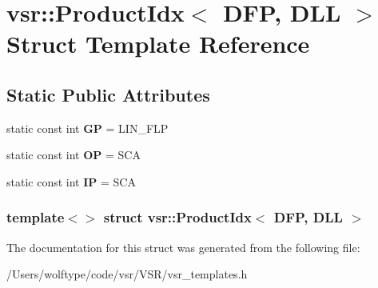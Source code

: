 \hypertarget{structvsr_1_1_product_idx_3_01_d_f_p_00_01_d_l_l_01_4}{\section{vsr\-:\-:Product\-Idx$<$ D\-F\-P, D\-L\-L $>$ Struct Template Reference}
\label{structvsr_1_1_product_idx_3_01_d_f_p_00_01_d_l_l_01_4}
}
\subsection*{Static Public Attributes}
\begin{DoxyCompactItemize}
\item 
\hypertarget{structvsr_1_1_product_idx_3_01_d_f_p_00_01_d_l_l_01_4_a5af3a64cda8984eb65e5a5571ae17bf0}{static const int {\bfseries G\-P} = L\-I\-N\-\_\-\-F\-L\-P}\label{structvsr_1_1_product_idx_3_01_d_f_p_00_01_d_l_l_01_4_a5af3a64cda8984eb65e5a5571ae17bf0}

\item 
\hypertarget{structvsr_1_1_product_idx_3_01_d_f_p_00_01_d_l_l_01_4_a1407108e6dfa6802c929dfd84cf74846}{static const int {\bfseries O\-P} = S\-C\-A}\label{structvsr_1_1_product_idx_3_01_d_f_p_00_01_d_l_l_01_4_a1407108e6dfa6802c929dfd84cf74846}

\item 
\hypertarget{structvsr_1_1_product_idx_3_01_d_f_p_00_01_d_l_l_01_4_a368595627ea723ea78c9e5df8757aa75}{static const int {\bfseries I\-P} = S\-C\-A}\label{structvsr_1_1_product_idx_3_01_d_f_p_00_01_d_l_l_01_4_a368595627ea723ea78c9e5df8757aa75}

\end{DoxyCompactItemize}
\subsubsection*{template$<$$>$ struct vsr\-::\-Product\-Idx$<$ D\-F\-P, D\-L\-L $>$}



The documentation for this struct was generated from the following file\-:\begin{DoxyCompactItemize}
\item 
/\-Users/wolftype/code/vsr/\-V\-S\-R/vsr\-\_\-templates.\-h\end{DoxyCompactItemize}
